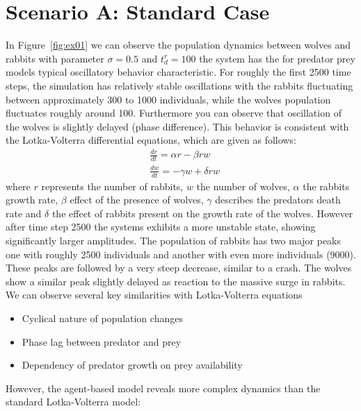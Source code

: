 \section{Scenario A: Standard Case}
In Figure~\ref{fig:ex01} we can observe the population dynamics between wolves and rabbits with parameter $\sigma = 0.5$ and $t_d^r = 100$ the system has the for predator prey models typical oscillatory behavior characteristic. For roughly the first 2500 time steps, the simulation has relatively stable oscillations with the rabbits fluctuating between approximately 300 to 1000 individuals, while the wolves population fluctuates roughly around 100. Furthermore you can observe that oscillation of the wolves is slightly delayed (phase difference). This behavior is consistent with the Lotka-Volterra differential equations, which are given as follows:
\begin{equation}
	\begin{aligned}
		 & \frac{d r}{d t}=\alpha r-\beta r w   \\
		 & \frac{d w}{d t}=-\gamma w+\delta r w
	\end{aligned}
	\label{eq:lv}
\end{equation}
where $r$ represents the number of rabbits, $w$ the number of wolves, $\alpha$ the rabbits growth rate, $\beta$ effect of the presence of wolves, $\gamma$ describes the predators death rate and $\delta$ the effect of rabbits present on the growth rate of the wolves.
However after time step 2500 the systems exhibits a more unstable state, showing significantly larger amplitudes. The population of rabbits has two major peaks one with roughly 2500 individuals and another with even more individuals (9000). These peaks are followed by a very steep decrease, similar to a crash. The wolves show a similar peak slightly delayed as reaction to the massive surge in rabbits.\newline
\newline
We can observe several key similarities with Lotka-Volterra equations
\begin{itemize}
	\item Cyclical nature of population changes
	\item Phase lag between predator and prey
	\item Dependency of predator growth on prey availability
\end{itemize}
However, the agent-based model reveals more complex dynamics than the standard Lotka-Volterra model:
